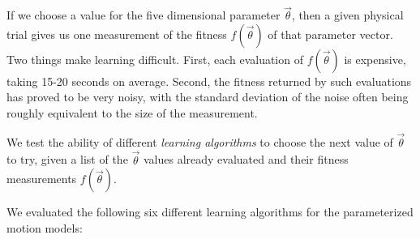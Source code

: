 If we choose a value for the five dimensional parameter
$\vec{\theta}$, then a given physical trial gives us one measurement
of the fitness $f(\vec{\theta})$ of that parameter vector.  Two
things make learning difficult.  First, each evaluation of
$f(\vec{\theta})$ is expensive, taking 15-20 seconds on
average.  Second, the fitness returned by such evaluations has proved
to be very noisy, with the standard deviation of the noise often being
roughly equivalent to the size of the measurement.

We test the ability of different \emph{learning algorithms} to choose the next value of $\vec{\theta}$ to try, given a list of the
$\vec{\theta}$ values already evaluated and their fitness measurements $f(\vec{\theta})$.

We evaluated the following six different
learning algorithms for the parameterized motion models: 







